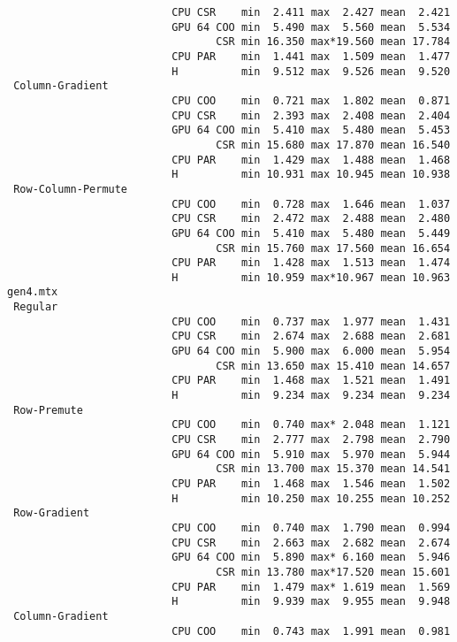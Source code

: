 {\begin{verbatim}
                          CPU CSR    min  2.411 max  2.427 mean  2.421
                          GPU 64 COO min  5.490 max  5.560 mean  5.534
                                 CSR min 16.350 max*19.560 mean 17.784
                          CPU PAR    min  1.441 max  1.509 mean  1.477
                          H          min  9.512 max  9.526 mean  9.520
 Column-Gradient
                          CPU COO    min  0.721 max  1.802 mean  0.871
                          CPU CSR    min  2.393 max  2.408 mean  2.404
                          GPU 64 COO min  5.410 max  5.480 mean  5.453
                                 CSR min 15.680 max 17.870 mean 16.540
                          CPU PAR    min  1.429 max  1.488 mean  1.468
                          H          min 10.931 max 10.945 mean 10.938
 Row-Column-Permute
                          CPU COO    min  0.728 max  1.646 mean  1.037
                          CPU CSR    min  2.472 max  2.488 mean  2.480
                          GPU 64 COO min  5.410 max  5.480 mean  5.449
                                 CSR min 15.760 max 17.560 mean 16.654
                          CPU PAR    min  1.428 max  1.513 mean  1.474
                          H          min 10.959 max*10.967 mean 10.963
gen4.mtx
 Regular
                          CPU COO    min  0.737 max  1.977 mean  1.431
                          CPU CSR    min  2.674 max  2.688 mean  2.681
                          GPU 64 COO min  5.900 max  6.000 mean  5.954
                                 CSR min 13.650 max 15.410 mean 14.657
                          CPU PAR    min  1.468 max  1.521 mean  1.491
                          H          min  9.234 max  9.234 mean  9.234
 Row-Premute
                          CPU COO    min  0.740 max* 2.048 mean  1.121
                          CPU CSR    min  2.777 max  2.798 mean  2.790
                          GPU 64 COO min  5.910 max  5.970 mean  5.944
                                 CSR min 13.700 max 15.370 mean 14.541
                          CPU PAR    min  1.468 max  1.546 mean  1.502
                          H          min 10.250 max 10.255 mean 10.252
 Row-Gradient
                          CPU COO    min  0.740 max  1.790 mean  0.994
                          CPU CSR    min  2.663 max  2.682 mean  2.674
                          GPU 64 COO min  5.890 max* 6.160 mean  5.946
                                 CSR min 13.780 max*17.520 mean 15.601
                          CPU PAR    min  1.479 max* 1.619 mean  1.569
                          H          min  9.939 max  9.955 mean  9.948
 Column-Gradient
                          CPU COO    min  0.743 max  1.991 mean  0.981

\end{verbatim}}
